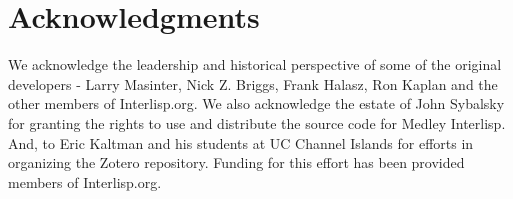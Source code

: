 \documentclass[sigconf]{acmart}
\begin{document}
\section*{Acknowledgments}

We acknowledge the leadership and historical perspective of some of the original developers - Larry Masinter, Nick Z. Briggs, Frank Halasz, Ron Kaplan and the other members of Interlisp.org. We also acknowledge the estate of John Sybalsky for granting the rights to use and distribute the source code for Medley Interlisp. And, to Eric Kaltman and his students at UC Channel Islands for efforts in organizing the Zotero repository. Funding for this effort has been provided members of Interlisp.org.



\end{document}
